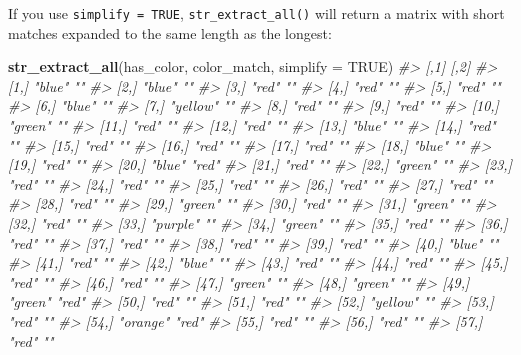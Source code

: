 \documentclass[]{book}
\newenvironment{Shaded}{\begin{snugshade}}{\end{snugshade}}
\newcommand{\CommentTok}[1]{\textcolor[rgb]{0.56,0.35,0.01}{\textit{#1}}}
\newcommand{\DataTypeTok}[1]{\textcolor[rgb]{0.13,0.29,0.53}{#1}}
\newcommand{\KeywordTok}[1]{\textcolor[rgb]{0.13,0.29,0.53}{\textbf{#1}}}
\newcommand{\NormalTok}[1]{#1}
\newcommand{\OtherTok}[1]{\textcolor[rgb]{0.56,0.35,0.01}{#1}}
\begin{document}
If you use \texttt{simplify\ =\ TRUE}, \texttt{str\_extract\_all()} will return a matrix with short matches expanded to the same length as the longest:

\begin{Shaded}
\begin{Highlighting}[]
\KeywordTok{str_extract_all}\NormalTok{(has_color, color_match, }\DataTypeTok{simplify =} \OtherTok{TRUE}\NormalTok{)}
\CommentTok{#>       [,1]     [,2] }
\CommentTok{#>  [1,] "blue"   ""   }
\CommentTok{#>  [2,] "blue"   ""   }
\CommentTok{#>  [3,] "red"    ""   }
\CommentTok{#>  [4,] "red"    ""   }
\CommentTok{#>  [5,] "red"    ""   }
\CommentTok{#>  [6,] "blue"   ""   }
\CommentTok{#>  [7,] "yellow" ""   }
\CommentTok{#>  [8,] "red"    ""   }
\CommentTok{#>  [9,] "red"    ""   }
\CommentTok{#> [10,] "green"  ""   }
\CommentTok{#> [11,] "red"    ""   }
\CommentTok{#> [12,] "red"    ""   }
\CommentTok{#> [13,] "blue"   ""   }
\CommentTok{#> [14,] "red"    ""   }
\CommentTok{#> [15,] "red"    ""   }
\CommentTok{#> [16,] "red"    ""   }
\CommentTok{#> [17,] "red"    ""   }
\CommentTok{#> [18,] "blue"   ""   }
\CommentTok{#> [19,] "red"    ""   }
\CommentTok{#> [20,] "blue"   "red"}
\CommentTok{#> [21,] "red"    ""   }
\CommentTok{#> [22,] "green"  ""   }
\CommentTok{#> [23,] "red"    ""   }
\CommentTok{#> [24,] "red"    ""   }
\CommentTok{#> [25,] "red"    ""   }
\CommentTok{#> [26,] "red"    ""   }
\CommentTok{#> [27,] "red"    ""   }
\CommentTok{#> [28,] "red"    ""   }
\CommentTok{#> [29,] "green"  ""   }
\CommentTok{#> [30,] "red"    ""   }
\CommentTok{#> [31,] "green"  ""   }
\CommentTok{#> [32,] "red"    ""   }
\CommentTok{#> [33,] "purple" ""   }
\CommentTok{#> [34,] "green"  ""   }
\CommentTok{#> [35,] "red"    ""   }
\CommentTok{#> [36,] "red"    ""   }
\CommentTok{#> [37,] "red"    ""   }
\CommentTok{#> [38,] "red"    ""   }
\CommentTok{#> [39,] "red"    ""   }
\CommentTok{#> [40,] "blue"   ""   }
\CommentTok{#> [41,] "red"    ""   }
\CommentTok{#> [42,] "blue"   ""   }
\CommentTok{#> [43,] "red"    ""   }
\CommentTok{#> [44,] "red"    ""   }
\CommentTok{#> [45,] "red"    ""   }
\CommentTok{#> [46,] "red"    ""   }
\CommentTok{#> [47,] "green"  ""   }
\CommentTok{#> [48,] "green"  ""   }
\CommentTok{#> [49,] "green"  "red"}
\CommentTok{#> [50,] "red"    ""   }
\CommentTok{#> [51,] "red"    ""   }
\CommentTok{#> [52,] "yellow" ""   }
\CommentTok{#> [53,] "red"    ""   }
\CommentTok{#> [54,] "orange" "red"}
\CommentTok{#> [55,] "red"    ""   }
\CommentTok{#> [56,] "red"    ""   }
\CommentTok{#> [57,] "red"    ""}
\end{Highlighting}
\end{Shaded}
\end{document}
